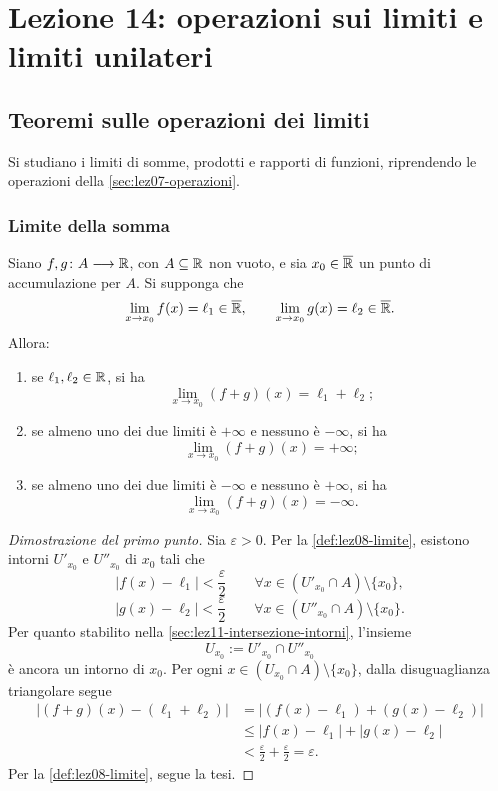 \chapter[Lezione 14 --- 27 ottobre 2026]{Lezione 14: operazioni sui limiti e limiti unilateri}
\label{chap:lezione-14}

\section{Teoremi sulle operazioni dei limiti}
\label{sec:lez14-operazioni-limiti}

Si studiano i limiti di somme, prodotti e rapporti di
funzioni, riprendendo le operazioni della
\cref{sec:lez07-operazioni}.

\subsection{Limite della somma}
\label{sec:lez14-limite-somma}

\begin{theorem}
\label{thm:lez14-limite-somma}
Siano \(f,g\colon A\longrightarrow\mathbb{R}\), con
\(A\subseteq\mathbb{R}\) non vuoto, e sia
\(x_0\in\overline{\mathbb{R}}\) un punto di accumulazione per \(A\).
Si supponga che
\[
  \lim_{x\to x_0}f(x)=\ell_1\in\overline{\mathbb{R}},
  \qquad
  \lim_{x\to x_0}g(x)=\ell_2\in\overline{\mathbb{R}}.
\]
Allora:
\begin{enumerate}
  \item se \(\ell_1,\ell_2\in\mathbb{R}\), si ha
  \[
    \lim_{x\to x_0}(f+g)(x)=\ell_1+\ell_2;
  \]
  \item se almeno uno dei due limiti è \(+\infty\) e
  nessuno è \(-\infty\), si ha
  \[
    \lim_{x\to x_0}(f+g)(x)=+\infty;
  \]
  \item se almeno uno dei due limiti è \(-\infty\) e
  nessuno è \(+\infty\), si ha
  \[
    \lim_{x\to x_0}(f+g)(x)=-\infty.
  \]
\end{enumerate}
\end{theorem}

\begin{proof}[Dimostrazione del primo punto]
Sia \(\varepsilon>0\). Per la \cref{def:lez08-limite},
esistono intorni \(U'_{x_0}\) e \(U''_{x_0}\) di \(x_0\)
tali che
\[
  |f(x)-\ell_1|<\frac{\varepsilon}{2}
  \qquad\forall x\in(U'_{x_0}\cap A)\setminus\{x_0\},
\]
\[
  |g(x)-\ell_2|<\frac{\varepsilon}{2}
  \qquad\forall x\in(U''_{x_0}\cap A)\setminus\{x_0\}.
\]
Per quanto stabilito nella
\cref{sec:lez11-intersezione-intorni}, l'insieme
\[
  U_{x_0}:=U'_{x_0}\cap U''_{x_0}
\]
è ancora un intorno di \(x_0\). Per ogni
\(x\in(U_{x_0}\cap A)\setminus\{x_0\}\), dalla
disuguaglianza triangolare segue
\[
\begin{aligned}
  |(f+g)(x)-(\ell_1+\ell_2)|
    &=|(f(x)-\ell_1)+(g(x)-\ell_2)|\\
    &\le |f(x)-\ell_1|+|g(x)-\ell_2|\\
    &<\frac{\varepsilon}{2}+\frac{\varepsilon}{2}
     =\varepsilon.
\end{aligned}
\]
Per la \cref{def:lez08-limite}, segue la tesi.
\end{proof}

